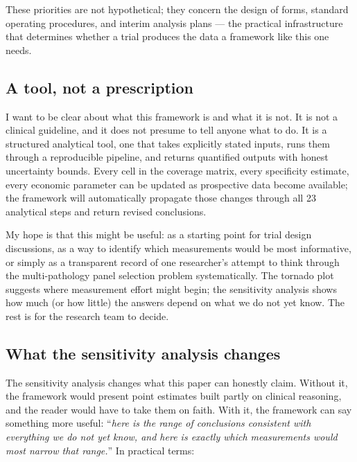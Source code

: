\documentclass[11pt, oneside]{article}
\begin{document}
These priorities are not hypothetical; they concern the design of forms, standard operating procedures, and interim analysis plans --- the practical infrastructure that determines whether a trial produces the data a framework like this one needs.

\subsection{A tool, not a prescription}

I want to be clear about what this framework is and what it is not. It is not a clinical guideline, and it does not presume to tell anyone what to do. It is a structured analytical tool, one that takes explicitly stated inputs, runs them through a reproducible pipeline, and returns quantified outputs with honest uncertainty bounds. Every cell in the coverage matrix, every specificity estimate, every economic parameter can be updated as prospective data become available; the framework will automatically propagate those changes through all 23 analytical steps and return revised conclusions.

My hope is that this might be useful: as a starting point for trial design discussions, as a way to identify which measurements would be most informative, or simply as a transparent record of one researcher's attempt to think through the multi-pathology panel selection problem systematically. The tornado plot suggests where measurement effort might begin; the sensitivity analysis shows how much (or how little) the answers depend on what we do not yet know. The rest is for the research team to decide.


\subsection{What the sensitivity analysis changes}

The sensitivity analysis changes what this paper can honestly claim. Without it, the framework would present point estimates built partly on clinical reasoning, and the reader would have to take them on faith. With it, the framework can say something more useful: ``\emph{here is the range of conclusions consistent with everything we do not yet know, and here is exactly which measurements would most narrow that range.}'' In practical terms:
\end{document}

